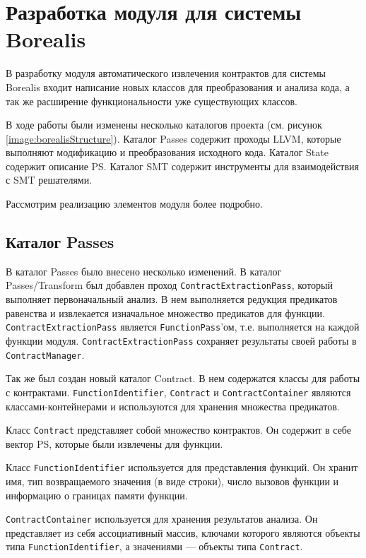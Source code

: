 \section{Разработка модуля для системы Borealis}
В разработку модуля автоматического извлечения контрактов для системы Borealis входит написание новых классов для преобразования и анализа кода, а так же расширение функциональности уже существующих классов.

В ходе работы были изменены несколько каталогов проекта (см. рисунок \ref{image:borealisStructure}). Каталог Passes содержит проходы LLVM, которые выполняют модификацию и преобразования исходного кода. Каталог State содержит описание PS. Каталог SMT содержит инструменты для взаимодействия с SMT решателями.

Рассмотрим реализацию элементов модуля более подробно.

\subsection{Каталог Passes}
В каталог Passes было внесено несколько изменений. В каталог Passes/Transform был добавлен проход \texttt{ContractExtractionPass}, который выполняет первоначальный анализ. В нем выполняется редукция предикатов равенства и извлекается изначальное множество предикатов для функции. \texttt{ContractExtractionPass} является \texttt{FunctionPass}'ом, т.е. выполняется на каждой функции модуля. \texttt{ContractExtractionPass} сохраняет результаты своей работы в \texttt{ContractManager}.

Так же был создан новый каталог Contract. В нем содержатся классы для работы с контрактами. \texttt{FunctionIdentifier}, \texttt{Contract} и \texttt{ContractContainer} являются классами-контейнерами и используются для хранения множества предикатов. 

Класс \texttt{Contract} представляет собой множество контрактов. Он содержит в себе вектор PS, которые были извлечены для функции.

Класс \texttt{FunctionIdentifier} используется для представления функций. Он хранит имя,  тип возвращаемого значения (в виде строки), число вызовов функции и информацию о границах памяти функции.

\texttt{ContractContainer} используется для хранения результатов анализа. Он представляет из себя ассоциативный массив, ключами которого являются объекты типа \texttt{FunctionIdentifier}, а значениями --- объекты типа \texttt{Contract}.

